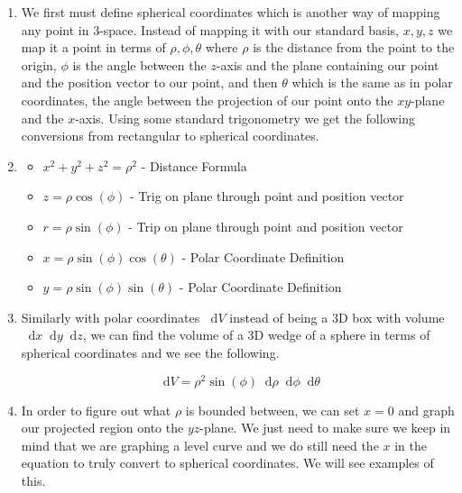 \documentclass[11pt]{article}
\newcommand*\dif{\mathop{}\!\mathrm{d}}
\begin{document}
\begin{enumerate}
\item We first must define spherical coordinates which is another way of mapping any point in 3-space. Instead of mapping it with our standard basis, $x,y,z$ we map it a point in terms of $\rho, \phi, \theta$ where $\rho$ is the distance from the point to the origin, $\phi$ is the angle between the $z$-axis and the plane containing our point and the position vector to our point, and then $\theta$ which is the same as in polar coordinates, the angle between the projection of our point onto the $xy$-plane and the $x$-axis. Using some standard trigonometry we get the following conversions from rectangular to spherical coordinates.


\item \begin{itemize}
    \item $x^2+y^2+z^2 = \rho^2$ - Distance Formula
    \item $z = \rho \cos{(\phi)}$ - Trig on plane through point and position vector
    \item $r = \rho \sin{(\phi)}$ - Trip on plane through point and position vector
    \item $x = \rho\sin{(\phi)}\cos{(\theta)}$ - Polar Coordinate Definition
    \item $y = \rho \sin{(\phi)}\sin{(\theta)}$ - Polar Coordinate Definition
\end{itemize}




\item Similarly with polar coordinates $\dif{V}$ instead of being a 3D box with volume $\dif{x}\dif{y}\dif{z}$, we can find the volume of a 3D wedge of a sphere in terms of spherical coordinates and we see the following.

\begin{equation*}
    \dif{V} = \rho^2 \sin{(\phi)} \dif{\rho} \dif{\phi} \dif{\theta}
\end{equation*}


\item In order to figure out what $\rho$ is bounded between, we can set $x=0$ and graph our projected region onto the $yz$-plane. We just need to make sure we keep in mind that we are graphing a level curve and we do still need the $x$ in the equation to truly convert to spherical coordinates. We will see examples of this.


\end{enumerate}
\end{document}
